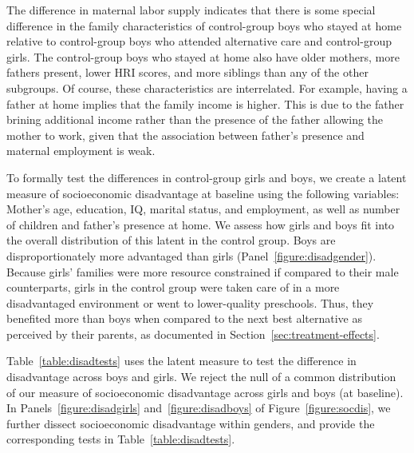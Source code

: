 The difference in maternal labor supply indicates that there is some special difference in the family characteristics of control-group boys who stayed at home relative to control-group boys who attended alternative care and control-group girls. The control-group boys who stayed at home also have older mothers, more fathers present, lower HRI scores, and more siblings than any of the other subgroups. Of course, these characteristics are interrelated. For example, having a father at home implies that the family income is higher. This is due to the father brining additional income rather than the presence of the father allowing the mother to work, given that the association between father's presence and maternal employment is weak. 

To formally test the differences in control-group girls and boys, we create a latent measure of socioeconomic disadvantage at baseline using the following variables: Mother's age, education, IQ, marital status, and employment, as well as number of children and father's presence at home. We assess how girls and boys fit into the overall distribution of this latent in the control group. Boys are disproportionately more advantaged than girls (Panel~\ref{figure:disadgender}). Because girls' families were more resource constrained if compared to their male counterparts, girls in the control group were taken care of in a more disadvantaged environment or went to lower-quality preschools. Thus, they benefited more than boys when compared to the next best alternative as perceived by their parents, as documented in Section~\ref{sec:treatment-effects}.

Table~\ref{table:disadtests} uses the latent measure to test the difference in disadvantage across boys and girls. We reject the null of a common distribution of our measure of socioeconomic disadvantage across girls and boys (at baseline). In Panels~\ref{figure:disadgirls} and~\ref{figure:disadboys} of Figure~\ref{figure:socdis}, we further dissect socioeconomic disadvantage within genders, and provide the corresponding tests in Table~\ref{table:disadtests}.

